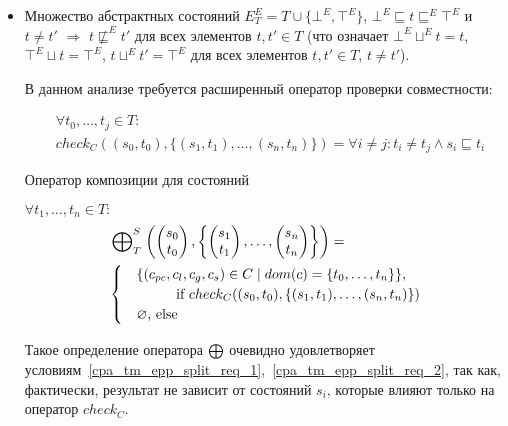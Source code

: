 \begin{itemize}

\item Множество абстрактных состояний $E^E_T=T \cup \{\bot^E,\top^E\}$, $\bot^E \sqsubseteq t \sqsubseteq^E \top^E$ и $t \neq t'$ $\Rightarrow$ $t \not\sqsubseteq^E t'$ для всех элементов $t, t'\in T$ 
(что означает $\bot^E \sqcup^E t = t$, $\top^E \sqcup t = \top^E$, $t \sqcup^E t' = \top^E$ для всех элементов $t,t'\in T$, $t\neq t'$).

В данном анализе требуется расширенный оператор проверки совместности:

\begin{align*}
& \forall t_0, \dots, t_j \in T: \\
& check_C((s_0, t_0), \{(s_1, t_1),\dots, (s_n,t_n)\}) = \forall i\ne j: t_i \neq t_j \land s_i \sqsubseteq t_i
\end{align*}

Оператор композиции для состояний

$\forall t_1, \dots, t_n \in T:$
\begin{equation}
\begin{aligned}
& \mathrel{\bigoplus}^S_T
\left(
\begin{pmatrix}
s_0 \\
t_0 
\end{pmatrix},
\left\{
\begin{pmatrix}
s_1 \\
t_1 
\end{pmatrix},
\dots ,
\begin{pmatrix}
s_n \\
t_n 
\end{pmatrix}
\right\}
\right) =  \\
& \begin{cases}
& \{(c_{pc},c_l,c_g,c_s) \in C \mid dom(c) = \{t_0, \dots, t_n\}\}, \\
& \hspace{1cm} \mbox{if } check_C((s_0, t_0), \{(s_1, t_1),\dots, (s_n,t_n)\})\\
& \varnothing \mbox{, else}
\end{cases}
\end{aligned}
\end{equation}

Такое определение оператора $\mathrel{\bigoplus}$ очевидно удовлетворяет условиям~\ref{cpa_tm_epp_split_req_1},~\ref{cpa_tm_epp_split_req_2}, так как, фактически, результат не зависит от состояний $s_i$, которые влияют только на оператор $check_C$.


\end{itemize}
